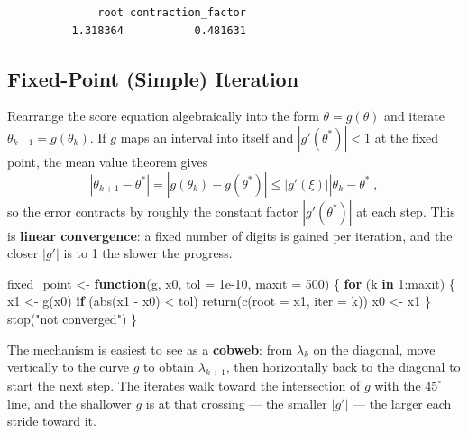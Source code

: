 \documentclass[
  letterpaper,
  DIV=11,
  numbers=noendperiod]{scrreprt}
\newenvironment{Shaded}{\begin{snugshade}}{\end{snugshade}}
\newcommand{\AttributeTok}[1]{\textcolor[rgb]{0.40,0.45,0.13}{#1}}
\newcommand{\ControlFlowTok}[1]{\textcolor[rgb]{0.00,0.23,0.31}{\textbf{#1}}}
\newcommand{\DecValTok}[1]{\textcolor[rgb]{0.68,0.00,0.00}{#1}}
\newcommand{\FloatTok}[1]{\textcolor[rgb]{0.68,0.00,0.00}{#1}}
\newcommand{\FunctionTok}[1]{\textcolor[rgb]{0.28,0.35,0.67}{#1}}
\newcommand{\NormalTok}[1]{\textcolor[rgb]{0.00,0.23,0.31}{#1}}
\newcommand{\OtherTok}[1]{\textcolor[rgb]{0.00,0.23,0.31}{#1}}
\newcommand{\SpecialCharTok}[1]{\textcolor[rgb]{0.37,0.37,0.37}{#1}}
\newcommand{\StringTok}[1]{\textcolor[rgb]{0.13,0.47,0.30}{#1}}
\begin{document}
\begin{verbatim}
              root contraction_factor 
          1.318364           0.481631 
\end{verbatim}

\subsection{Fixed-Point (Simple)
Iteration}\label{fixed-point-simple-iteration}

Rearrange the score equation algebraically into the form
\(\theta = g(\theta)\) and iterate \(\theta_{k+1} = g(\theta_k)\). If
\(g\) maps an interval into itself and \(|g'(\theta^{*})| < 1\) at the
fixed point, the mean value theorem gives
\[\left|\theta_{k+1} - \theta^{*}\right| = \left|g(\theta_k) - g(\theta^{*})\right| \le \left|g'(\xi)\right| \left|\theta_k - \theta^{*}\right| ,\]
so the error contracts by roughly the constant factor
\(|g'(\theta^{*})|\) at each step. This is \textbf{linear convergence}:
a fixed number of digits is gained per iteration, and the closer
\(|g'|\) is to 1 the slower the progress.

\begin{Shaded}
\begin{Highlighting}[]
\NormalTok{fixed\_point }\OtherTok{\textless{}{-}} \ControlFlowTok{function}\NormalTok{(g, x0, }\AttributeTok{tol =} \FloatTok{1e{-}10}\NormalTok{, }\AttributeTok{maxit =} \DecValTok{500}\NormalTok{) \{}
  \ControlFlowTok{for}\NormalTok{ (k }\ControlFlowTok{in} \DecValTok{1}\SpecialCharTok{:}\NormalTok{maxit) \{}
\NormalTok{    x1 }\OtherTok{\textless{}{-}} \FunctionTok{g}\NormalTok{(x0)}
    \ControlFlowTok{if}\NormalTok{ (}\FunctionTok{abs}\NormalTok{(x1 }\SpecialCharTok{{-}}\NormalTok{ x0) }\SpecialCharTok{\textless{}}\NormalTok{ tol) }\FunctionTok{return}\NormalTok{(}\FunctionTok{c}\NormalTok{(}\AttributeTok{root =}\NormalTok{ x1, }\AttributeTok{iter =}\NormalTok{ k))}
\NormalTok{    x0 }\OtherTok{\textless{}{-}}\NormalTok{ x1}
\NormalTok{  \}}
  \FunctionTok{stop}\NormalTok{(}\StringTok{"not converged"}\NormalTok{)}
\NormalTok{\}}
\end{Highlighting}
\end{Shaded}

The mechanism is easiest to see as a \textbf{cobweb}: from \(\lambda_k\)
on the diagonal, move vertically to the curve \(g\) to obtain
\(\lambda_{k+1}\), then horizontally back to the diagonal to start the
next step. The iterates walk toward the intersection of \(g\) with the
\(45^{\circ}\) line, and the shallower \(g\) is at that crossing --- the
smaller \(|g'|\) --- the larger each stride toward it.
\end{document}
